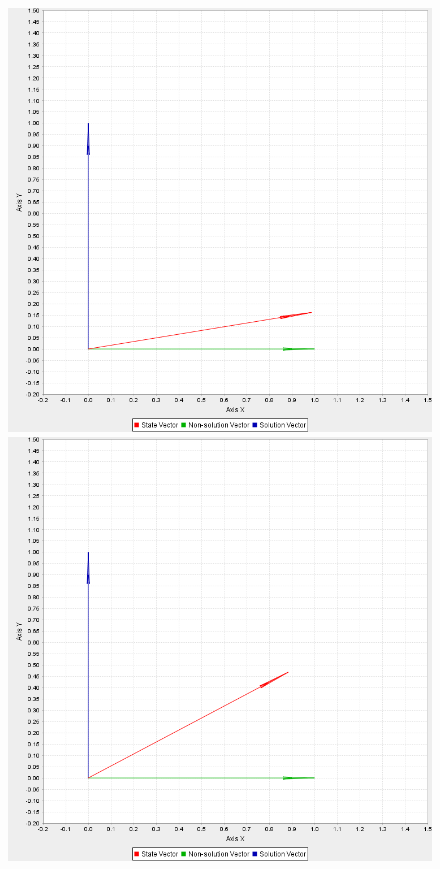 \documentclass[bibliography=totocnumbered, 10pt]{article}
\theoremstyle{NoticeStyle}
\begin{document}
\begin{figure}[H]
	\begin{minipage}{0.3\textwidth}
		\includegraphics[width=\textwidth]{img/pic_0.png}
	\end{minipage}
	\begin{minipage}{0.3\textwidth}
		\includegraphics[width=\textwidth]{img/pic_3.png}

\end{minipage}
\end{figure}
\end{document}
